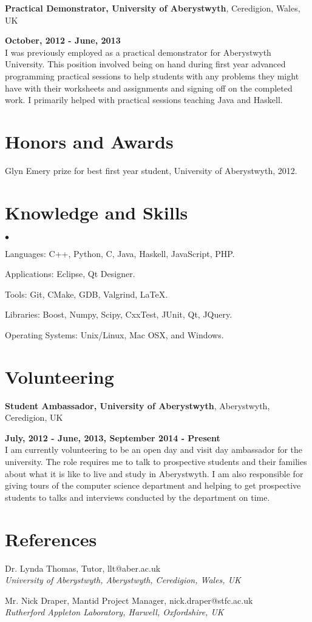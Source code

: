 \documentclass[margin,line]{res}
\newenvironment{list2}{
  \begin{list}{$\bullet$}{%
      \setlength{\itemsep}{0in}
      \setlength{\parsep}{0in} \setlength{\parskip}{0in}
      \setlength{\topsep}{0in} \setlength{\partopsep}{0in}
      \setlength{\leftmargin}{0.2in}}}{\end{list}}
\begin{document}
\begin{resume}
{\bf Practical Demonstrator, University of Aberystwyth}, Ceredigion, Wales, UK

\vspace{-.3cm}
\hfill {\bf  October, 2012 - June, 2013}\\
I was previously employed as a practical demonstrator for Aberystwyth University. This position involved being on hand during first year advanced programming practical sessions to help students with any problems they might have with their worksheets and assignments and signing off on the completed work. I primarily helped with practical sessions teaching Java and Haskell.

\section{\sc Honors and Awards}
Glyn Emery prize for best first year student, University of Aberystwyth, 2012.

\section{\sc Knowledge and  Skills}
\begin{list2}
\item Languages:  C++, Python, C, Java, Haskell, JavaScript, PHP.
\item Applications: Eclipse, Qt Designer.
\item Tools: Git, CMake, GDB, Valgrind, \LaTeX.
\item Libraries: Boost, Numpy, Scipy, CxxTest, JUnit, Qt, JQuery.
\item Operating Systems:  Unix/Linux, Mac OSX, and Windows.\\
\end{list2}

\section{\sc Volunteering}
{\bf Student Ambassador, University of Aberystwyth}, Aberystwyth, Ceredigion, UK

\vspace{-.3cm}
\hfill {\bf July, 2012 - June, 2013, September 2014 - Present}\\
I am currently volunteering to be an open day and visit day ambassador for the university. The role requires me to talk to prospective students and their families about what it is like to live and study in Aberystwyth. I am also responsible for giving tours of the computer science department and helping to get prospective students to talks and interviews conducted by the department on time.

\section{\sc References}
Dr. Lynda Thomas, Tutor, llt@aber.ac.uk \\
{\em University of Aberystwyth, Aberystwyth, Ceredigion, Wales, UK}

Mr. Nick Draper, Mantid Project Manager, nick.draper@stfc.ac.uk \\
{\em Rutherford Appleton Laboratory, Harwell, Oxfordshire, UK}

\end{resume}
\end{document}
